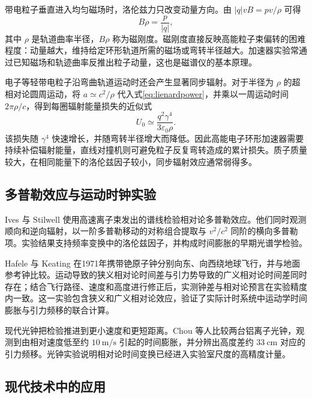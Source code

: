 \documentclass[style=classic,color=full]{lc-article}
\begin{document}
带电粒子垂直进入均匀磁场时，洛伦兹力只改变动量方向。由 $\lvert q\rvert vB=pv/\rho$ 可得
\begin{equation}
  \boxed{B\rho=\frac{p}{\lvert q\rvert},}
  \label{eq:magneticrigidity}
\end{equation}
其中 $\rho$ 是轨道曲率半径，$B\rho$ 称为磁刚度。磁刚度直接反映高能粒子束偏转的困难程度：动量越大，维持给定环形轨道所需的磁场或弯转半径越大。加速器实验常通过已知磁场和轨迹曲率反推出粒子动量，这也是磁谱仪的基本原理。

电子等轻带电粒子沿弯曲轨道运动时还会产生显著同步辐射。对于半径为 $\rho$ 的超相对论圆周运动，将 $a\simeq c^2/\rho$ 代入式\eqref{eq:lienardpower}，并乘以一周运动时间 $2\pi\rho/c$，得到每圈辐射能量损失的近似式
\begin{equation}
  U_0\simeq
  \frac{q^2\gamma^4}{3\varepsilon_0\rho}.
  \label{eq:synchrotronlossperturn}
\end{equation}
该损失随 $\gamma^4$ 快速增长，并随弯转半径增大而降低。因此高能电子环形加速器需要持续补偿辐射能量，直线对撞机则可避免粒子反复弯转造成的累计损失。质子质量较大，在相同能量下的洛伦兹因子较小，同步辐射效应通常弱得多\cite{jackson,pdg2024}。

\subsection{多普勒效应与运动时钟实验}

Ives 与 Stilwell 使用高速离子束发出的谱线检验相对论多普勒效应。他们同时观测顺向和逆向辐射，以一阶多普勒移动的对称组合提取与 $v^2/c^2$ 同阶的横向多普勒项。实验结果支持频率变换中的洛伦兹因子，并构成时间膨胀的早期光谱学检验\cite{ivesstilwell1938}。

Hafele 与 Keating 在1971年携带铯原子钟分别向东、向西绕地球飞行，并与地面参考钟比较。运动导致的狭义相对论时间差与引力势导致的广义相对论时间差同时存在；结合飞行路径、速度和高度进行修正后，实测钟差与相对论预言在实验精度内一致\cite{hafele1972theory,hafele1972experiment}。这一实验包含狭义和广义相对论效应，验证了实际计时系统中运动学时间膨胀与引力频移的联合计算。

现代光钟把检验推进到更小速度和更短距离。Chou 等人比较两台铝离子光钟，观测到由相对速度低至约 $\SI{10}{\metre\per\second}$ 引起的时间膨胀，并分辨出高度差约 $\SI{33}{\centi\metre}$ 对应的引力频移\cite{chou2010}。光钟实验说明相对论时间变换已经进入实验室尺度的高精度计量。

\subsection{现代技术中的应用}
\end{document}
